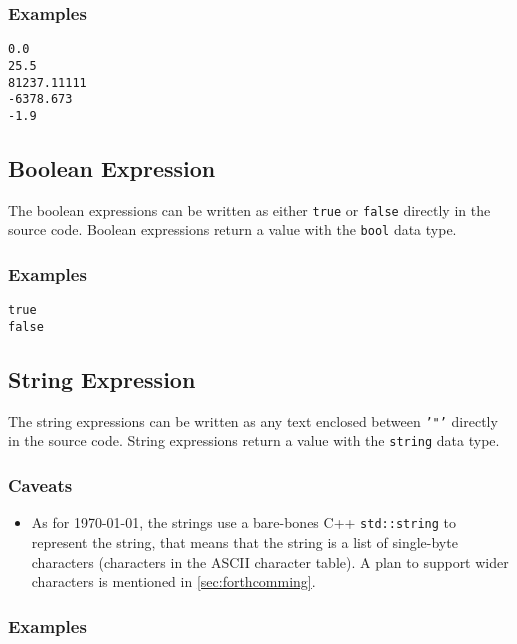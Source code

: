 \subsubsection{Examples}

\begin{lstlisting}
0.0
25.5
81237.11111
-6378.673
-1.9
\end{lstlisting}

\subsection{Boolean Expression}

The boolean expressions can be written as either \texttt{true} or \texttt{false} directly in the source code.
Boolean expressions return a value with the \texttt{bool} data type.

\subsubsection{Examples}

\begin{lstlisting}
true
false
\end{lstlisting}

\subsection{String Expression}

The string expressions can be written as any text enclosed between \texttt{'"'} directly in the source code.
String expressions return a value with the \texttt{string} data type.

\subsubsection{Caveats}

\begin{itemize}
    \item As for \today, the strings use a bare-bones C++ \texttt{std::string} to represent the string, that means that the string
        is a list of single-byte characters (characters in the ASCII character table). A plan to support wider characters is mentioned
        in \autoref{sec:forthcomming}.
\end{itemize}

\subsubsection{Examples}

